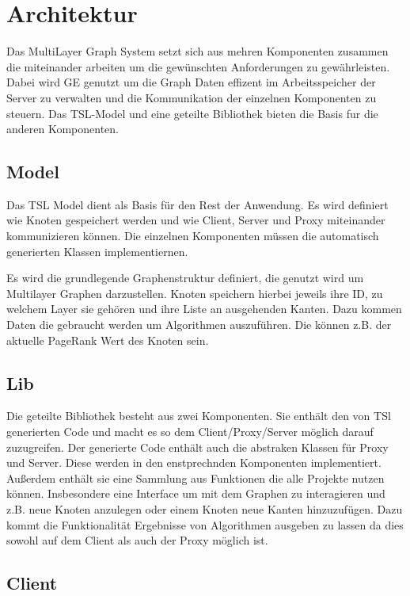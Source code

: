 
\section{Architektur}

Das MultiLayer Graph System setzt sich aus mehren Komponenten zusammen die miteinander arbeiten um die gewünschten Anforderungen zu gewährleisten.
Dabei wird GE genutzt um die Graph Daten effizent im Arbeitsspeicher der Server zu verwalten und die Kommunikation der einzelnen Komponenten zu steuern.  Das TSL-Model und eine geteilte Bibliothek bieten die Basis fur die
anderen Komponenten.

\subsection{Model}

Das TSL Model dient als Basis für den Rest der Anwendung. Es wird definiert wie Knoten gespeichert werden und wie Client, Server und Proxy miteinander
kommunizieren können. Die einzelnen Komponenten müssen die automatisch generierten Klassen implementiernen.


Es wird die grundlegende Graphenstruktur definiert, die genutzt wird um Multilayer Graphen darzustellen. Knoten speichern hierbei jeweils ihre ID, zu welchem Layer sie gehören
und ihre Liste an ausgehenden Kanten. Dazu kommen Daten die gebraucht werden um Algorithmen auszuführen. Die können z.B. der aktuelle PageRank Wert des Knoten sein.


\subsection{Lib}

Die geteilte Bibliothek besteht aus zwei Komponenten. Sie enthält den von TSl generierten Code und macht es so dem Client/Proxy/Server möglich darauf zuzugreifen. Der generierte Code enthält auch die abstraken Klassen für Proxy und Server. Diese werden in den enstprechnden Komponenten implementiert. Außerdem enthält sie
eine Sammlung aus Funktionen die alle Projekte nutzen können. Insbesondere eine Interface um mit dem Graphen zu interagieren und z.B. neue Knoten anzulegen oder einem Knoten neue Kanten hinzuzufügen.
Dazu kommt die Funktionalität Ergebnisse von Algorithmen ausgeben zu lassen da dies sowohl auf dem Client als auch der Proxy möglich ist.


\subsection{Client}

